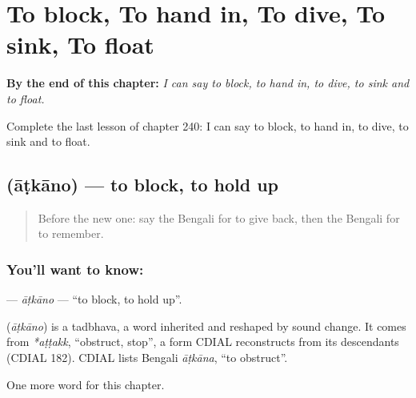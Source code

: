 
\chapter{To block, To hand in, To dive, To sink, To float}
\label{ch:bn-to-block-to-hand-in-to-dive-to-sink-to-float}

\begin{chapteropening}
\textbf{By the end of this chapter:} \emph{I can say to block, to hand in, to dive, to sink and to float.}

Complete the last lesson of chapter 240: I can say to block, to hand in, to dive, to sink and to float.
\end{chapteropening}

\section[\texorpdfstring{\bn{আটকানো} (āṭkāno)}{আটকানো (āṭkāno)}]{ (āṭkāno) — to block, to hold up}

\label{lesson:BN-C240-atkano}



\begin{quote}
Before the new one: say the Bengali for to give back, then the Bengali for to remember.
\end{quote}

\subsection*{You'll want to know: }
\textbf{} — \emph{āṭkāno} — \textquotedblleft{}to block, to hold up\textquotedblright{}.

\begin{cousinweb}
\textbf{} (\emph{āṭkāno}) is a tadbhava, a word inherited and reshaped by sound change. It comes from \emph{*aṭṭakk}, \textquotedblleft{}obstruct, stop\textquotedblright{}, a form CDIAL reconstructs from its descendants (CDIAL 182). CDIAL lists Bengali \emph{āṭkāna}, \textquotedblleft{}to obstruct\textquotedblright{}.
\end{cousinweb}

\begin{grammarlens}[title={What you've built}]
One more word for this chapter.
\end{grammarlens}

